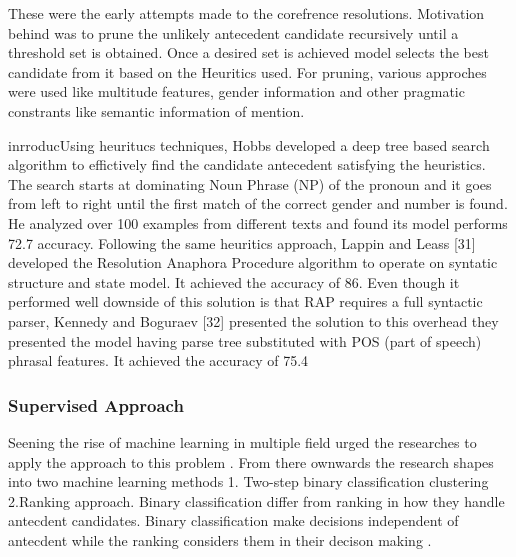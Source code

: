 \documentclass[11pt]{article}
\begin{document}
These were the early attempts made to the corefrence resolutions. Motivation behind was to prune the unlikely antecedent candidate recursively until a threshold set is obtained. Once a desired set is achieved model selects the best candidate from it based on the Heuritics used. For pruning, various approches were used like multitude features, gender information and other pragmatic constrants like semantic information of mention.


inrroducUsing  heuritucs techniques, Hobbs developed a deep tree based search algorithm to effictively find the candidate antecedent satisfying the heuristics. The search starts at dominating Noun Phrase (NP) of the pronoun and it goes from left to right until the first match of the correct gender and number is found. He analyzed over 100 examples from different texts and found its model performs 72.7 accuracy. Following the same heuritics approach, Lappin and Leass [31] developed the Resolution Anaphora Procedure algorithm to operate on syntatic structure and state model. It achieved the accuracy of 86. Even though it performed well downside of this solution is that RAP requires a full syntactic parser, Kennedy and Boguraev [32] presented the solution to this overhead they presented the model having parse tree substituted with POS (part of speech) phrasal features. It achieved the accuracy of 75.4


\subsubsection{Supervised Approach}

Seening the rise of machine learning in multiple field urged the researches to apply the approach to this problem . From there ownwards the research shapes into two machine learning methods 1. Two-step binary classification clustering 2.Ranking approach. Binary classification differ from ranking in how they handle antecdent candidates. Binary classification make decisions independent of antecdent while the ranking considers them in their decison making .
\end{document}
